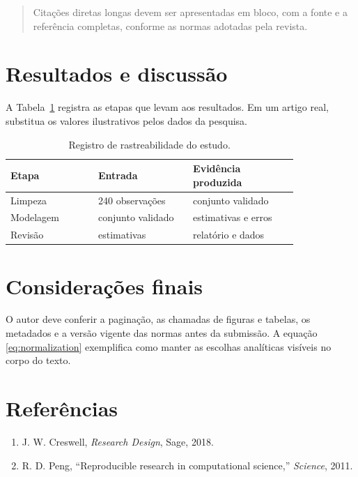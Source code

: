 \documentclass[12pt,a4paper]{article}
\begin{document}
\begin{quote}
  Citações diretas longas devem ser apresentadas em bloco, com a fonte e a
  referência completas, conforme as normas adotadas pela revista.
\end{quote}

\section{Resultados e discussão}
A Tabela~\ref{tab:trace} registra as etapas que levam aos resultados. Em um
artigo real, substitua os valores ilustrativos pelos dados da pesquisa.
\begin{table}[ht]
  \centering
  \caption{Registro de rastreabilidade do estudo.}
  \label{tab:trace}
  \begin{tabular}{p{0.25\linewidth}p{0.27\linewidth}p{0.30\linewidth}}
    \toprule
    Etapa & Entrada & Evidência produzida \\
    \midrule
    Limpeza & 240 observações & conjunto validado \\
    Modelagem & conjunto validado & estimativas e erros \\
    Revisão & estimativas & relatório e dados \\
    \bottomrule
  \end{tabular}
\end{table}

\section{Considerações finais}
O autor deve conferir a paginação, as chamadas de figuras e tabelas, os
metadados e a versão vigente das normas antes da submissão. A equação
\eqref{eq:normalization} exemplifica como manter as escolhas analíticas
visíveis no corpo do texto.

\section*{Referências}
\begin{enumerate}
  \item J. W. Creswell, \emph{Research Design}, Sage, 2018.
  \item R. D. Peng, ``Reproducible research in computational science,''
  \emph{Science}, 2011.
\end{enumerate}
\end{document}
